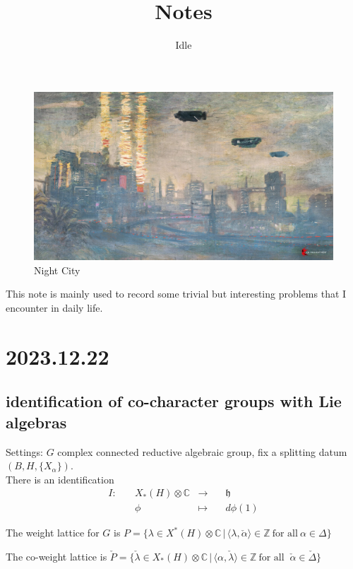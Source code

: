 \documentclass[12pt]{amsart}
\author{Idle}
\numberwithin{equation}{section}
\newcommand{\BC}{{\mathbb {C}}}
\newcommand{\BZ}{{\mathbb {Z}}}
\newcommand{\fh}{\mathfrak{h}}
\newcommand{\set}[2]{\{#1\,|\,#2\}}
\newcommand{\defmap}[5]{
           \begin{equation*}
              \begin{aligned}
                   #1:\quad  & #2 &\longrightarrow &\quad #3 \\
                      \quad  & #4    &\longmapsto  &\quad #5
              \end{aligned}
           \end{equation*}
          }
\begin{document}
\title[Notes]{Notes}
\maketitle
\begin{figure}
  \centering
  \includegraphics[width=1.0\linewidth]{Claude_Monet-NC.jpg}
  \caption{Night City}
  \label{night City}
\end{figure}
This note is mainly used to record some trivial
but interesting problems that I encounter
in daily life.


\newpage


\tableofcontents

\newpage

\section{2023.12.22}\label{1}

\subsection{identification of co-character groups with Lie algebras}
Settings: $G$ complex connected reductive algebraic group, fix a splitting datum
$(B,H,\{X_\alpha\})$.\\


There is an identification \defmap{I}{X_*(H)\otimes \BC}{\fh}{\phi}{d\phi(1)}


The weight lattice for $G$ is $P = \set{\lambda \in X^*(H)\otimes \BC}{\langle \lambda, \check{\alpha} \rangle \in \BZ \ \textrm{for all} \ \alpha \in \Delta }$


The co-weight lattice is $\check{P} = \set{\check{\lambda} \in X_*(H)\otimes \BC}{\langle\alpha , \check{\lambda} \rangle \in \BZ \ \textrm{for all } \ \check{\alpha} \in \check{\Delta}}$
\end{document}
